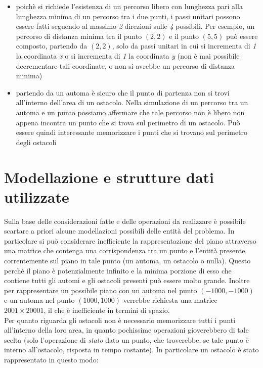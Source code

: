 \documentclass[a4paper,11pt]{article}
\begin{document}
\begin{itemize}
    \item poichè si richiede l'esistenza di un percorso libero con lunghezza pari alla lunghezza minima di un percorso tra i due punti, i passi unitari possono essere fatti seguendo al massimo \textit{2} direzioni sulle \textit{4} possibili. Per esempio, un percorso di distanza minima tra il punto $(2, 2)$ e il punto $(5, 5)$ può essere composto, partendo da $(2, 2)$, solo da passi unitari in cui si incrementa di \textit{1} la coordinata \textit{x} o si incrementa di \textit{1} la coordinata \textit{y} (non è mai possibile decrementare tali coordinate, o non si avrebbe un percorso di distanza minima)

    \item partendo da un automa è sicuro che il punto di partenza non si trovi all'interno dell'area di un ostacolo. Nella simulazione di un percorso tra un automa e un punto possiamo affermare che tale percorso non è libero non appena incontra un punto che si trova sul perimetro di un ostacolo. Può essere quindi interessante memorizzare i punti che si trovano sul perimetro degli ostacoli
\end{itemize}

\section{Modellazione e strutture dati utilizzate}

Sulla base delle considerazioni fatte e delle operazioni da realizzare è possibile scartare a priori alcune modellazioni possibili delle entità del problema. In particolare si può considerare inefficiente la rappresentazione del piano attraverso una matrice che contenga una corrispondenza tra un punto e l'entità presente correntemente sul piano in tale punto (un automa, un ostacolo o nulla). Questo perchè il piano è potenzialmente infinito e la minima porzione di esso che contiene tutti gli automi e gli ostacoli presenti può essere molto grande. Inoltre per rappresentare un possibile piano con un automa nel punto $(-1000, -1000)$ e un automa nel punto $(1000, 1000)$ verrebbe richiesta una matrice $2001 \times 20001$, il che è inefficiente in termini di spazio. \\
Per quanto riguarda gli ostacoli non è necessario memorizzare tutti i punti all'interno della loro area, in quanto pochissime operazioni gioverebbero di tale scelta (solo l'operazione di \textit{stato} dato un punto, che troverebbe, se tale punto è interno all'ostacolo, risposta in tempo costante). In particolare un ostacolo è stato rappresentato in questo modo:
\end{document}
